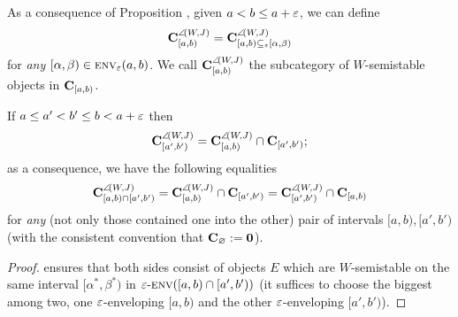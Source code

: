 \begin{definition}
As a consequence of Proposition , given $a<b\leq a+\varepsilon $, we can define
\[
\textbf{C}^{\angle\!(W,J)}_{[a,b)}=\textbf{C}^{\angle\!(W,J)}_{[a,b)\subseteq_\varepsilon  [\alpha,\beta)}
\]
for \emph{any} $[\alpha,\beta) \in \textsc{env}_\varepsilon(a,b)$. We call $\textbf{C}^{\angle\!(W,J)}_{[a,b)}$ the subcategory of $W$\hyp{}semistable objects in $\textbf{C}_{[a,b)}$.
\end{definition}
\begin{proposition}
If $a\leq a'<b'\leq b<a+\varepsilon $ then
\[
\textbf{C}^{\angle\!(W,J)}_{ [a',b')}=\textbf{C}^{\angle\!(W,J)}_{[a,b)}\cap \textbf{C}_{[a',b')};
\]
as a consequence, we have the following equalities
\[
\textbf{C}^{\angle\!(W,J)}_{[a,b)\cap [a',b')} = \textbf{C}^{\angle\!(W,J)}_{[a,b)}\cap \textbf{C}_{[a',b')} = \textbf{C}^{\angle\!(W,J)}_{[a',b')}\cap \textbf{C}_{[a,b)}
\]
for \emph{any} (not only those contained one into the other) pair of intervals $[a,b), [a',b')$ (with the consistent convention that $\textbf{C}_\varnothing := \textbf{0}$).
\end{proposition}
\begin{proof}
\aprop {} ensures that both sides consist of objects $E$ which are $W$\hyp{}semistable on the same interval $[\alpha^*,\beta^*)$ in $\varepsilon\text{-}\textsc{env}([a,b)\cap [a',b'))$ (it suffices to choose the biggest among two, one $\varepsilon$\hyp{}enveloping $[a,b)$ and the other $\varepsilon$\hyp{}enveloping $[a',b')$).
\end{proof}

